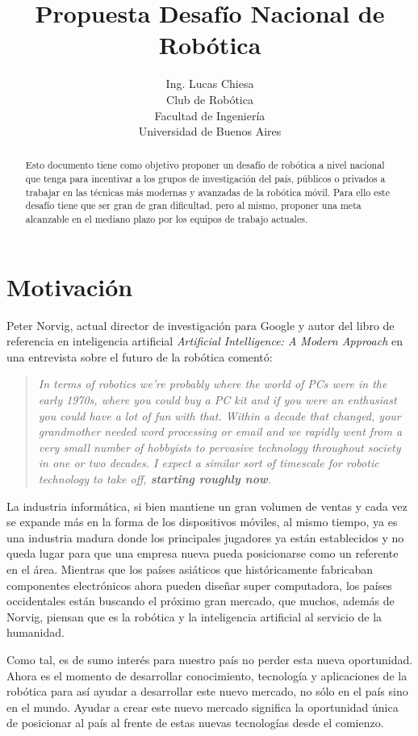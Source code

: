 \documentclass[a4paper,12pt]{article}
\author{Ing. Lucas Chiesa \\ Club de Robótica \\ Facultad de Ingeniería \\ Universidad de Buenos Aires}
\title{Propuesta Desafío Nacional de Robótica}
\begin{document}


\begin{abstract}
 Esto documento tiene como objetivo proponer un desafío de robótica a nivel nacional que tenga para incentivar a los grupos de investigación del país, públicos o privados a trabajar en las técnicas más modernas y avanzadas de la robótica móvil. Para ello este desafío tiene que ser gran de gran dificultad, pero al mismo, proponer una meta alcanzable en el mediano plazo por los equipos de trabajo actuales.
\end{abstract}

\newpage
\section{Motivación}

Peter Norvig, actual director de investigación para Google y autor del libro de referencia en inteligencia artificial \textit{Artificial Intelligence: A Modern Approach} en una entrevista sobre el futuro de la robótica comentó:

\begin{quote}
\textit{In terms of robotics we’re probably where the world of PCs were in the early 1970s, where you could buy a PC kit and if you were an enthusiast you could have a lot of fun with that. Within a decade that changed, your grandmother needed word processing or email and we rapidly went from a very small number of hobbyists to pervasive technology throughout society in one or two decades. I expect a similar sort of timescale for robotic technology to take off, \textbf{starting roughly now}.}
\end{quote}

La industria informática, si bien mantiene un gran volumen de ventas y cada vez se expande más en la forma de los dispositivos móviles, al mismo tiempo, ya es una industria madura donde los principales jugadores ya están establecidos y no queda lugar para que una empresa nueva pueda posicionarse como un referente en el área. Mientras que los países asiáticos que históricamente fabricaban componentes electrónicos ahora pueden diseñar super computadora, los países occidentales están buscando el próximo gran mercado, que muchos, además de Norvig, piensan que es la robótica y la inteligencia artificial al servicio de la humanidad.

Como tal, es de sumo interés para nuestro país no perder esta nueva oportunidad. Ahora es el momento de desarrollar conocimiento, tecnología y aplicaciones de la robótica para así ayudar a desarrollar este nuevo mercado, no sólo en el país sino en el mundo. Ayudar a crear este nuevo mercado significa la oportunidad única de posicionar al país al frente de estas nuevas tecnologías desde el comienzo.
 
\end{document}
